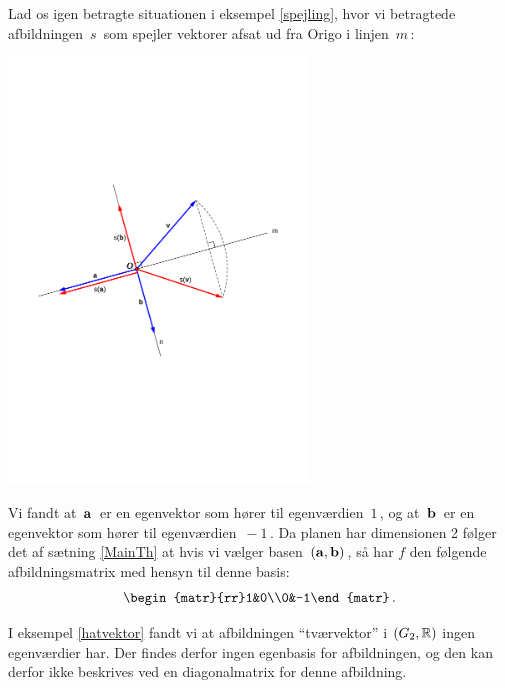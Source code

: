 \begin{example}\label{spejling2}
Lad os igen betragte situationen i eksempel \ref{spejling}, hvor vi betragtede afbildningen $\,s\,$ som spejler vektorer afsat ud fra Origo i linjen $\,m\,$:
\begin{center}
\includegraphics[trim=2cm 9.2cm 2cm 9cm,width=0.6\textwidth,clip]{evSpejling.pdf}  
\end{center}
Vi fandt at $\,\mathbf{a}\,$ er en egenvektor som hører til egenværdien $\,1\,$, og at $\,\mathbf{b}\,$ er en egenvektor som hører til egenværdien $\,-1\,$. Da planen har dimensionen 2 følger det af sætning \ref{MainTh} at hvis vi vælger basen $\,(\mathbf{a},\mathbf{b})\,$, så har $f$ den følgende afbildningsmatrix med hensyn til denne basis:
$$\begin{matr}{rr}1&0\\0&-1\end{matr}\,.$$
\end{example}

\begin{example}
I eksempel \ref{hatvektor} fandt vi at afbildningen ``tværvektor'' i $(G_2,\mathbb{R})$ ingen egenværdier har. Der findes derfor ingen egenbasis for afbildningen, og den kan derfor ikke beskrives ved en diagonalmatrix for denne afbildning.
\end{example}

